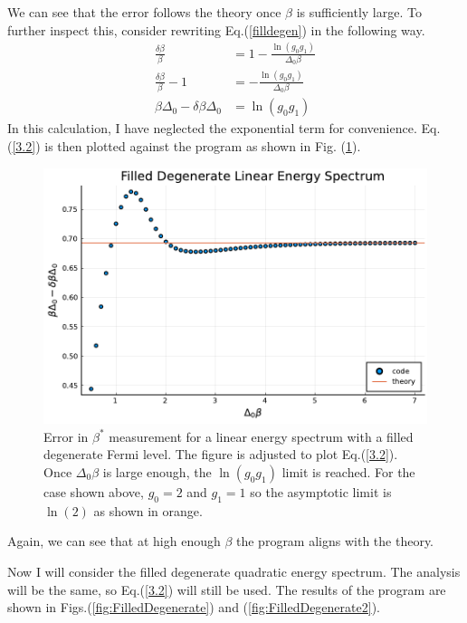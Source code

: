 We can see that the error follows the theory once $\beta$ is sufficiently large. To further inspect this, consider rewriting Eq.\@ (\ref{filldegen}) in the following way. 
\begin{align}
    \frac{\delta\beta}{\beta}&=1-\frac{\ln(g_0g_1)}{\Delta_0\beta}\nonumber\\
    \frac{\delta\beta}{\beta}-1&=-\frac{\ln(g_0g_1)}{\Delta_0\beta}\nonumber\\
    \beta\Delta_0-\delta\beta\Delta_0&=\ln(g_0g_1) \label{3.2}
\end{align}
In this calculation, I have neglected the exponential term for convenience. Eq.\@ (\ref{3.2}) is then plotted against the program as shown in Fig. (\ref{fig:FilledDegenerateLinearSpectrumAdjustedError}). 
\begin{figure}[H]
    \centering
    \includegraphics[scale=0.75]{figures/pdf/linE_filldegen_g0-2_N10_1.pdf}
    \caption{Error in $\beta^*$ measurement for a linear energy spectrum with a filled
degenerate Fermi level. The figure is adjusted to plot Eq.\@ (\ref{3.2}). Once $\Delta_0\beta$ is large enough, the $\ln(g_0g_1)$ limit is reached. For the case shown above, $g_0=2$ and $g_1=1$ so the asymptotic limit is $\ln(2)$ as shown in orange.}
    \label{fig:FilledDegenerateLinearSpectrumAdjustedError}
\end{figure}
Again, we can see that at high enough $\beta$ the program aligns with the theory. 

Now I will consider the filled degenerate quadratic energy spectrum. The analysis will be the same, so Eq.\@ (\ref{3.2}) will still be used. The results of the program are shown in Figs.\@ (\ref{fig:FilledDegenerate}) and (\ref{fig:FilledDegenerate2}). 

